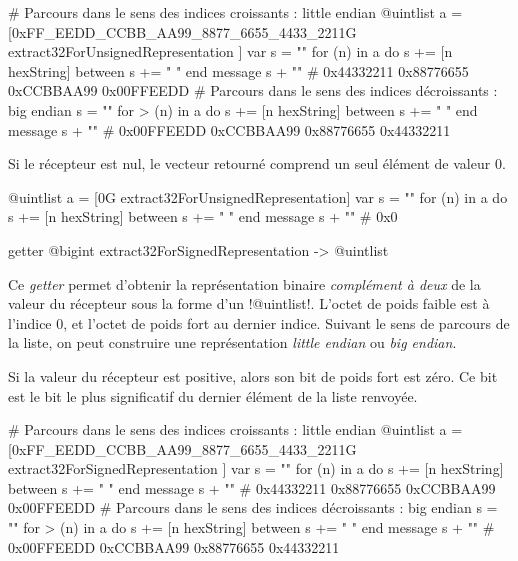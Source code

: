 \begin{galgas}
# Parcours dans le sens des indices croissants : little endian
@uintlist a = [0xFF_EEDD_CCBB_AA99_8877_6655_4433_2211G
  extract32ForUnsignedRepresentation
]
var s = ""
for (n) in a
  do s += [n hexString]
  between s += " "
end
message s + "\n" # 0x44332211 0x88776655 0xCCBBAA99 0x00FFEEDD 
# Parcours dans le sens des indices décroissants : big endian
s = ""
for > (n) in a
  do s += [n hexString]
  between s += " "
end
message s + "\n" # 0x00FFEEDD 0xCCBBAA99 0x88776655 0x44332211
\end{galgas}

Si le récepteur est nul, le vecteur retourné comprend un seul élément de valeur $0$.

\begin{galgas}
@uintlist a = [0G extract32ForUnsignedRepresentation]
var s = ""
for (n) in a
  do s += [n hexString]
  between s += " "
end
message s + "\n" # 0x0
\end{galgas}





\begin{galgasbox}
getter @bigint extract32ForSignedRepresentation -> @uintlist
\end{galgasbox}

Ce \emph{getter} permet d'obtenir la représentation binaire \emph{complément à deux} de la valeur du récepteur sous la forme d'un \ggs!@uintlist!. L'octet de poids faible est à l'indice $0$, et l'octet de poids fort au dernier indice. Suivant le sens de parcours de la liste, on peut construire une représentation \emph{little endian} ou \emph{big endian}.

Si la valeur du récepteur est positive, alors son bit de poids fort est zéro. Ce bit est le bit le plus significatif du dernier élément de la liste renvoyée.

\begin{galgas}
# Parcours dans le sens des indices croissants : little endian
@uintlist a = [0xFF_EEDD_CCBB_AA99_8877_6655_4433_2211G
  extract32ForSignedRepresentation
]
var s = ""
for (n) in a
  do s += [n hexString]
  between s += " "
end
message s + "\n" # 0x44332211 0x88776655 0xCCBBAA99 0x00FFEEDD
# Parcours dans le sens des indices décroissants : big endian
s = ""
for > (n) in a
  do s += [n hexString]
  between s += " "
end
message s + "\n" # 0x00FFEEDD 0xCCBBAA99 0x88776655 0x44332211
\end{galgas}

